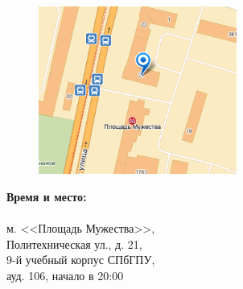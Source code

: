 \documentclass[12pt]{article}
\begin{document}
\begin{minipage}{0.5\textwidth}
\begin{figure}[H]
\includegraphics[width=6.5cm]{map.png} 
\end{figure}
\end{minipage} \hfill
\begin{minipage}{0.45\textwidth}
\textbf{Время и место:}\\
\\
м. <<Площадь Мужества>>,\\
Политехническая ул., д. 21,\\
9-й учебный корпус СПбГПУ,\\
ауд. 106, начало в 20:00\\
\end{minipage}
\end{document}
